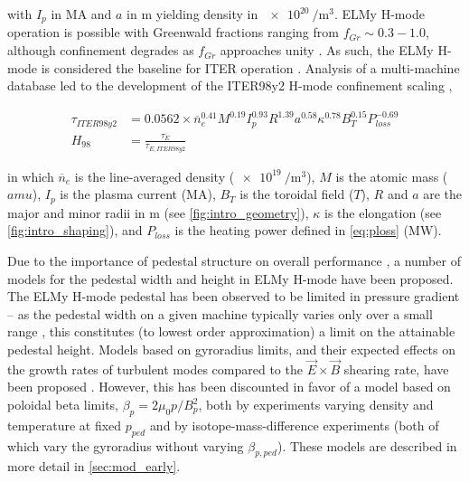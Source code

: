 \noindent with $I_p$ in $\si{\mega\ampere}$ and $a$ in $\si{\meter}$ yielding density in $\SI{e20}{\per\meter\cubed}$.  ELMy H-mode operation is possible with Greenwald fractions ranging from $f_{Gr} \sim 0.3-1.0$, although confinement degrades as $f_{Gr}$ approaches unity \cite{Saibene1999,Joffrin2014}.  As such, the ELMy H-mode is considered the baseline for ITER operation \cite{ITER1999,Shimada2007}.  Analysis of a multi-machine database \cite{Christiansen1992} led to the development of the ITER98y2 H-mode confinement scaling \cite{ITER1999},

\begin{align}
 \tau_{ITER98y2} &= 0.0562 \times \overline{n}_e^{0.41} M^{0.19} I_p^{0.93} R^{1.39} a^{0.58} \kappa^{0.78} B_T^{0.15} P_{loss}^{-0.69}\label{eq:tau98}\\
 H_{98} &= \frac{\tau_E}{\tau_{E,ITER98y2}}\label{eq:H98}
\end{align}

\noindent in which $\overline{n}_e$ is the line-averaged density ($\SI{e19}{\per\meter\cubed}$), $M$ is the atomic mass ($\si{amu}$), $I_p$ is the plasma current ($\si{\mega\ampere}$), $B_T$ is the toroidal field ($\si{T}$), $R$ and $a$ are the major and minor radii in $\si{\meter}$ (see \cref{fig:intro_geometry}), $\kappa$ is the elongation (see \cref{fig:intro_shaping}), and $P_{loss}$ is the heating power defined in \cref{eq:ploss} ($\si{\mega\watt}$).

Due to the importance of pedestal structure on overall performance \cite{Kinsey2011}, a number of models for the pedestal width and height in ELMy H-mode have been proposed.  The ELMy H-mode pedestal has been observed to be limited in pressure gradient \cite{Connor1998,Urano2003} -- as the pedestal width on a given machine typically varies only over a small range \cite{Maggi2010,Schneider2013}, this constitutes (to lowest order approximation) a limit on the attainable pedestal height.  Models based on gyroradius limits, and their expected effects on the growth rates of turbulent modes compared to the $\vec{E}\times\vec{B}$ shearing rate, have been proposed \cite{Groebner1998a,Beurskens2011}.  However, this has been discounted in favor of a model based on poloidal beta limits, $\beta_p = 2\mu_0 p/B_p^2$, both by experiments varying density and temperature at fixed $p_{ped}$ \cite{Osborne1998} and by isotope-mass-difference experiments \cite{Urano2008} (both of which vary the gyroradius without varying $\beta_{p,ped}$).  These models are described in more detail in \cref{sec:mod_early}.

